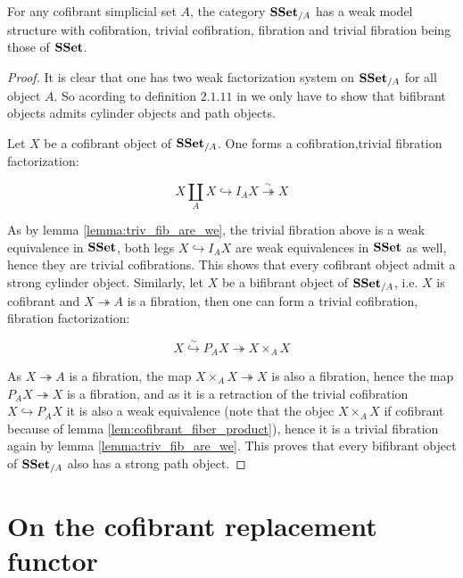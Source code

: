 \documentclass[reqno,10pt,a4paper,oneside,draft]{amsart}
\begin{document}

\begin{corollary}
For any cofibrant simplicial set $A$, the category $\mathbf{SSet}_{/A}$ has a weak model structure with cofibration, trivial cofibration, fibration and trivial fibration being those of $\mathbf{SSet}$.
\end{corollary}

\begin{proof}

It is clear that one has two weak factorization system on $\mathbf{SSet}_{/A}$ for all object $A$. So acording to definition $2.1.11$ in \cite{henry2018wms} we only have to show that bifibrant objects admits cylinder objects and path objects.

Let $X$ be a cofibrant object of $\mathbf{SSet}_{/A}$. One forms a cofibration,trivial fibration factorization:

\[ X \coprod_A X \hookrightarrow I_A X \overset{\sim}{\twoheadrightarrow} X \]

As by lemma \ref{lemma:triv_fib_are_we}, the trivial fibration above is a weak equivalence in $\mathbf{SSet}$, both legs $X \hookrightarrow I_A X$ are weak equivalences in $\mathbf{SSet}$ as well, hence they are trivial cofibrations. This shows that every cofibrant object admit a strong cylinder object. Similarly, let $X$ be a bifibrant object of $\mathbf{SSet}_{/A}$, i.e. $X$ is cofibrant and $X \twoheadrightarrow A$ is a fibration, then one can form a trivial cofibration, fibration factorization:

\[ X \overset{\sim}{\hookrightarrow} P_A X {\twoheadrightarrow} X \times_{A} X \]

As $X \twoheadrightarrow A$ is a fibration, the map $X \times_A X \twoheadrightarrow X$ is also a fibration, hence the map $P_A X \twoheadrightarrow X$ is a fibration, and as it is a retraction of the trivial cofibration $X \hookrightarrow P_A X$ it is also a weak equivalence (note that the objec $X \times_A X$ if cofibrant because of lemma \ref{lem:cofibrant_fiber_product}), hence it is a trivial fibration again by lemma \ref{lemma:triv_fib_are_we}. This proves that every bifibrant object of $\mathbf{SSet}_{/A}$ also has a strong path object.

\end{proof}

\newpage

\section{On the cofibrant replacement functor}
\end{document}
